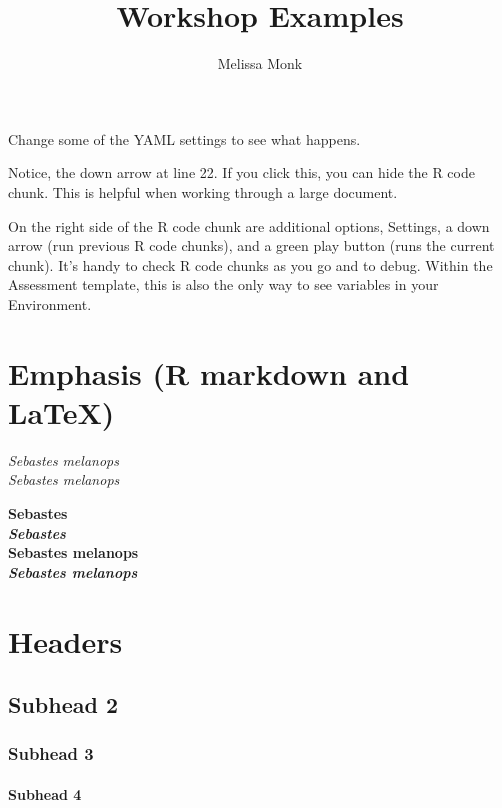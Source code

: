 \documentclass[12pt,]{article}
\title{Workshop Examples}
\author{Melissa Monk}
\date{}
\begin{document}
\maketitle


{
\hypersetup{linkcolor=black}
\setcounter{tocdepth}{4}
\tableofcontents
}
Change some of the YAML settings to see what happens.

Notice, the down arrow at line 22. If you click this, you can hide the R
code chunk. This is helpful when working through a large document.

On the right side of the R code chunk are additional options, Settings,
a down arrow (run previous R code chunks), and a green play button (runs
the current chunk). It's handy to check R code chunks as you go and to
debug. Within the Assessment template, this is also the only way to see
variables in your Environment.

\section{Emphasis (R markdown and
LaTeX)}\label{emphasis-r-markdown-and-latex}

\emph{Sebastes} \emph{melanops}\\\emph{Sebastes melanops}

\textbf{Sebastes}\\\textbf{\emph{Sebastes}}\\\textbf{Sebastes melanops}\\\emph{\textbf{Sebastes melanops}}

\section*{Headers}\label{headers}

\subsection{Subhead 2}\label{subhead-2}

\subsubsection*{Subhead 3}\label{subhead-3}

\paragraph{Subhead 4}\label{subhead-4}
\end{document}
